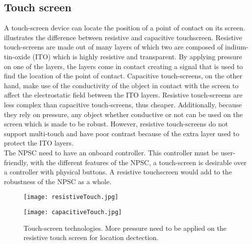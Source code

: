 \subsection{Touch screen}
A touch-screen device can locate the position of a point of contact on its screen. 
 illustrates the difference between resistive and capacitive touchscreen. Resistive touch-screens are made out of many layers of which two are composed of indium-tin-oxide (ITO) which is highly resistive and transparent. By applying pressure on one of the layers, the layers come in contact creating a signal that is used to find the location of the point of contact. Capacitive touch-screens, on the other hand, make use of the conductivity of the object in contact with the screen to affect the electrostatic field between the ITO layers. Resistive touch-screens are less complex than capacitive touch-screens, thus cheaper. Additionally, because they rely on pressure, any object whether conductive or not can be used on the screen which is made to be robust. However, resistive touch-screens do not support multi-touch and have poor contrast because of the extra layer used to protect the ITO layers.\\
The NPSC need to have an onboard controller. This controller must be user-friendly, with the different features of the NPSC, a touch-screen is desirable over a controller with physical buttons. A resistive touchscreen would add to the robustness of the NPSC as a whole.   
\begin{figure}[h!]
\centering
\begin{minipage}[b]{0.45\textwidth}
\texttt{[image: resistiveTouch.jpg]}
\label{fig:resistive_screen}
\end{minipage}
\begin{minipage}[b]{0.45\textwidth}
\texttt{[image: capacitiveTouch.jpg]}
\label{fig:capacitive_screen}
\end{minipage}
\caption{Touch-screen technologies. More pressure need to be applied on the resistive touch screen for location dectection.}
\label{fig:screen}
\end{figure}    

